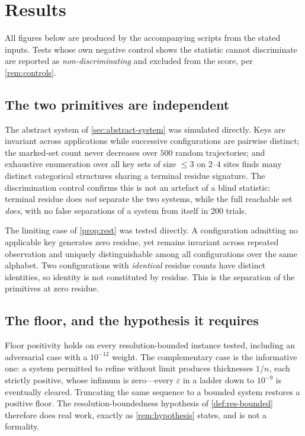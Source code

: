 \documentclass[11pt,twocolumn,a4paper]{article}
\theoremstyle{plain}
\theoremstyle{definition}
\theoremstyle{remark}
\begin{document}
\section{Results}
\label{sec:results}

All figures below are produced by the accompanying scripts from the stated
inputs. Tests whose own negative control shows the statistic cannot
discriminate are reported as \emph{non-discriminating} and excluded from the
score, per \cref{rem:controls}.

\subsection{The two primitives are independent}

The abstract system of \cref{sec:abstract-system} was simulated directly.
Keys are invariant across applications while successive configurations are
pairwise distinct; the marked-set count never decreases over $500$ random
trajectories; and exhaustive enumeration over all key sets of size
$\leq 3$ on $2$--$4$ sites finds many distinct categorical structures sharing
a terminal residue signature. The discrimination control confirms this is not
an artefact of a blind statistic: terminal residue does \emph{not} separate the
two systems, while the full reachable set \emph{does}, with no false
separations of a system from itself in $200$ trials.

The limiting case of \cref{prop:rest} was tested directly. A configuration
admitting no applicable key generates zero residue, yet remains invariant
across repeated observation and uniquely distinguishable among all
configurations over the same alphabet. Two configurations with \emph{identical}
residue counts have distinct identities, so identity is not constituted by
residue. This is the separation of the primitives at zero residue.

\subsection{The floor, and the hypothesis it requires}

Floor positivity holds on every resolution-bounded instance tested, including
an adversarial case with a $10^{-12}$ weight. The complementary case is the
informative one: a system permitted to refine without limit produces
thicknesses $1/n$, each strictly positive, whose infimum is zero---every
$\varepsilon$ in a ladder down to $10^{-9}$ is eventually cleared. Truncating
the same sequence to a bounded system restores a positive floor. The
resolution-boundedness hypothesis of \cref{def:res-bounded} therefore does real
work, exactly as \cref{rem:hypothesis} states, and is not a formality.
\end{document}
